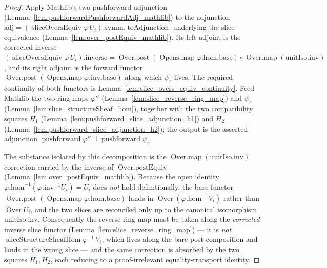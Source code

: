 \begin{proof}
    \leanok
  Apply Mathlib's two-pushforward adjunction (Lemma~\ref{lem:pushforwardPushforwardAdj_mathlib}) to the
  adjunction \(\mathrm{adj} = (\operatorname{sliceOversEquiv}\varphi\,U_i).\mathrm{symm}.
  \operatorname{toAdjunction}\) underlying the slice equivalence
  (Lemma~\ref{lem:over_postEquiv_mathlib}). Its left adjoint is the corrected inverse
  \((\operatorname{sliceOversEquiv}\varphi\,U_i).\mathrm{inverse} =
  \operatorname{Over.post}(\operatorname{Opens.map}\varphi.\mathrm{hom}.\mathrm{base}) \circ
  \operatorname{Over.map}(\mathrm{unitIso}.\mathrm{inv})\), and its right adjoint is the forward functor
  \(\operatorname{Over.post}(\operatorname{Opens.map}\varphi.\mathrm{inv}.\mathrm{base})\) along which
  \(\psi_r\) lives. The required continuity of both functors is
  Lemma~\ref{lem:slice_overs_equiv_continuity}. Feed Mathlib the two ring maps \(\varphi''\)
  (Lemma~\ref{lem:slice_reverse_ring_map}) and \(\psi_r\) (Lemma~\ref{lem:slice_structureSheaf_hom}),
  together with the two compatibility squares \(H_1\) (Lemma~\ref{lem:pushforward_slice_adjunction_h1})
  and \(H_2\) (Lemma~\ref{lem:pushforward_slice_adjunction_h2}); the output is the asserted adjunction
  \(\operatorname{pushforward}\varphi'' \dashv \operatorname{pushforward}\psi_r\).

  The substance isolated by this decomposition is the
  \(\operatorname{Over.map}(\mathrm{unitIso}.\mathrm{inv})\) correction carried by the inverse of
  \(\operatorname{Over.postEquiv}\) (Lemma~\ref{lem:over_postEquiv_mathlib}). Because the open identity
  \(\varphi.\mathrm{hom}^{-1}(\varphi.\mathrm{inv}^{-1} U_i) = U_i\) does \emph{not} hold
  definitionally, the bare functor
  \(\operatorname{Over.post}(\operatorname{Opens.map}\varphi.\mathrm{hom}.\mathrm{base})\) lands in
  \(\operatorname{Over}(\varphi.\mathrm{hom}^{-1} V_i)\) rather than \(\operatorname{Over} U_i\), and the
  two slices are reconciled only up to the canonical isomorphism \(\mathrm{unitIso}.\mathrm{inv}\).
  Consequently the reverse ring map must be taken along the \emph{corrected} inverse slice functor
  (Lemma~\ref{lem:slice_reverse_ring_map}) --- it is \emph{not}
  \(\operatorname{sliceStructureSheafHom}\varphi^{-1}\,V_i\), which lives along the bare post-composition
  and lands in the wrong slice --- and the same correction is absorbed by the two squares \(H_1, H_2\),
  each reducing to a proof-irrelevant equality-transport identity.
\end{proof}

